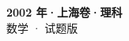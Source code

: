 \documentclass[zihao=-4, a4paper]{ctexart}
\begin{document}
\begin{center}
  {\Large\bfseries 2002 年·上海卷·理科}\\[4pt]
  {\large 数学 · 试题版}
\end{center}
\medskip
{}

\end{document}
